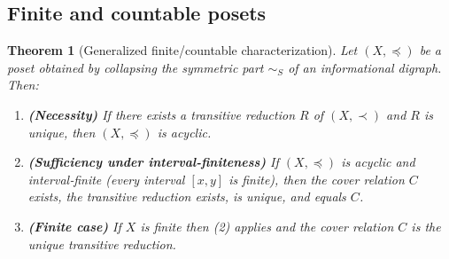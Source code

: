 \documentclass[11pt]{article}
\newtheorem{theorem}[definition]{Theorem}
\begin{document}
\subsection{Finite and countable posets}

\begin{theorem}[Generalized finite/countable characterization]\label{thm:generalized-finite-countable}
Let \((X,\preceq)\) be a poset obtained by collapsing the symmetric part
\(\sim_S\) of an informational digraph. Then:
\begin{enumerate}[leftmargin=*]
  \item \textbf{(Necessity)} If there exists a transitive reduction \(R\)
    of \((X,\prec)\) and \(R\) is unique, then \((X,\preceq)\) is acyclic.
  \item \textbf{(Sufficiency under interval‑finiteness)} If
    \((X,\preceq)\) is acyclic and interval‑finite (every interval
    \([x,y]\) is finite), then the cover relation \(C\) exists, the
    transitive reduction exists, is unique, and equals \(C\).
  \item \textbf{(Finite case)} If \(X\) is finite then (2) applies and
    the cover relation \(C\) is the unique transitive reduction.
\end{enumerate}
\end{theorem}
\end{document}
